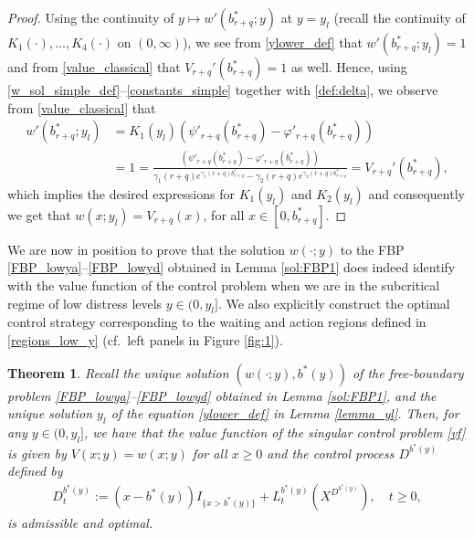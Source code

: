 \documentclass[11pt]{article} %
\newtheorem{theorem}{Theorem}
\renewcommand{\phi}{\varphi}
\numberwithin{komcounter}{section}
\numberwithin{equation}{section}
\numberwithin{theorem}{section}
\begin{document}
\begin{proof}
Using the continuity of $y \mapsto w'(b^*_{r+q}; y)$ at $y=y_l$ (recall the continuity of $K_1(\cdot), \dots, K_4(\cdot)$ on $(0, \infty)$), we see from \eqref{ylower_def} that 
$w'(b^*_{r+q}; y_l)=1$ and from \eqref{value_classical} that $V_{r+q}'(b^*_{r+q})=1$ as well. 
Hence, using \eqref{w_sol_simple_def}--\eqref{constants_simple} together with \eqref{def:delta}, we observe from \eqref{value_classical} that
\begin{align*}
w'(b^*_{r+q}; y_l) 
&= K_1(y_l) \left(\psi'_{r+q}(b^*_{r+q}) - \phi'_{r+q}(b^*_{r+q}) \right) \\
&= 1 
= \frac{\left(\psi'_{r+q}(b^*_{r+q})-\phi'_{r+q}(b^*_{r+q})\right)}{\gamma_1(r+q) e^{\gamma_1(r+q) b^*_{r+q}} - \gamma_2(r+q) e^{\gamma_2(r+q)b^*_{r+q}}} 
= V_{r+q}'(b^*_{r+q}),
\end{align*}
which implies the desired expressions for $K_1(y_l)$ and $K_2(y_l)$ and consequently we get that $w(x; y_l) = V_{r+q}(x)$, for all $x \in [0,b^*_{r+q}]$.
\end{proof}

We are now in position to prove that the solution $w(\cdot;y)$ to the FBP \eqref{FBP_lowya}--\eqref{FBP_lowyd} obtained in Lemma \ref{sol:FBP1} does indeed identify with the value function of the control problem when we are in the subcritical regime of low distress levels $y \in (0,y_l]$. 
We also explicitly construct the optimal control strategy corresponding to the waiting and action regions defined in \eqref{regions_low_y}
(cf.~left panels in Figure \ref{fig:1}).


\begin{theorem} \label{thm:sub}
Recall the unique solution $(w(\cdot;y), b^*(y))$ of the free-boundary problem \eqref{FBP_lowya}--\eqref{FBP_lowyd} obtained in Lemma \ref{sol:FBP1}, and the unique solution $y_l$ of the equation \eqref{ylower_def} in Lemma \ref{lemma_yl}. 
Then, for any $y\in(0,y_l]$, we have that the value function of the singular control problem \eqref{vf} is given by $V(x;y) = w(x;y)$ for all $x\geq 0$ and the control process $D^{b^*(y)}$ defined by 
\begin{align*}
D^{b^*(y)}_t := (x-b^*(y)) I_{\{x>b^*(y)\}} + L^{b^*(y)}_t(X^{D^{b^*(y)}}), 
\quad t \geq 0,
\end{align*}
is admissible and optimal.
\end{theorem}
\end{document}
